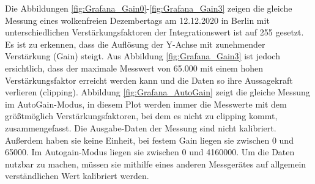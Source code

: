 Die Abbildungen \ref{fig:Grafana_Gain0}-\ref{fig:Grafana_Gain3} zeigen die gleiche Messung eines wolkenfreien Dezembertags am 12.12.2020 in Berlin mit unterschiedlichen Verstärkungsfaktoren der Integrationswert ist auf 255 gesetzt.\\
Es ist zu erkennen, dass die Auflösung der Y-Achse mit zunehmender Verstärkung (Gain) steigt. Aus Abbildung \ref{fig:Grafana_Gain3} ist jedoch ersichtlich, dass der maximale Messwert von 65.000 mit einem hohen Verstärkungsfaktor erreicht werden kann und die Daten so ihre Aussagekraft verlieren (clipping).
Abbildung \ref{fig:Grafana_AutoGain} zeigt die gleiche Messung im AutoGain-Modus, 
in diesem Plot werden immer die Messwerte mit dem größtmöglich Verstärkungsfaktoren, bei dem es nicht zu clipping kommt, zusammengefasst.
Die Ausgabe-Daten der Messung sind nicht kalibriert.
Außerdem haben sie keine Einheit, bei festem Gain liegen sie zwischen 0 und 65000.
Im Autogain-Modus liegen sie zwischen 0 und 4160000.
Um die Daten nutzbar zu machen, müssen sie mithilfe eines anderen Messgerätes auf allgemein verständlichen Wert kalibriert werden.

